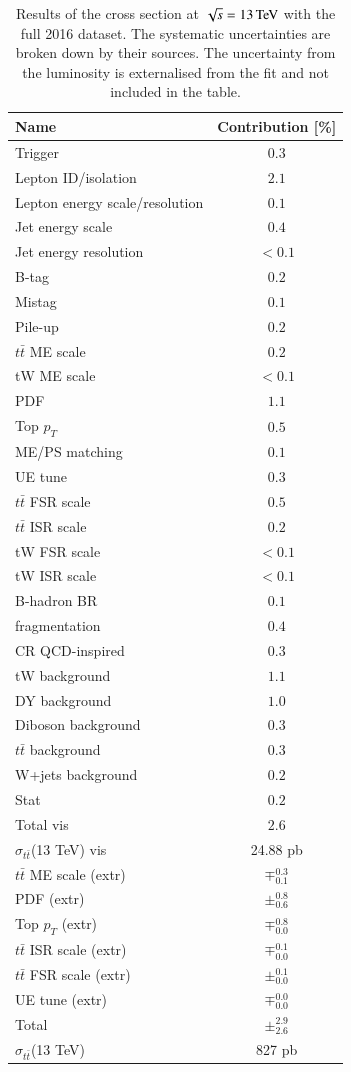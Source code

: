 \begin{table}[htbp!]
\center
\caption{Results of the \ttbar cross section at $\sqrt{s}= 13 \,\text{Te\hspace{-.08em}V}$ with the full 2016 dataset. The systematic uncertainties are broken down by their sources. The uncertainty from the luminosity is externalised from the fit
and not included in the table. 
\label{tab:lh_res_eightsimple}}
\begin{tabular}{ l |  c }
 \hline
Name & Contribution [\%] \\ \hline
Trigger & ${0.3}$ \\
Lepton ID/isolation & ${2.1}$ \\
Lepton energy scale/resolution & ${0.1}$ \\
Jet energy scale & ${0.4}$ \\
Jet energy resolution & ${ < 0.1}$ \\
B-tag & ${0.2}$ \\
Mistag & ${0.1}$ \\
Pile-up & ${0.2}$ \\
$t\bar{t}$ ME scale & ${0.2}$ \\
tW ME scale & ${< 0.1}$ \\
PDF & ${1.1}$ \\
Top $p_{T}$ & ${0.5}$ \\
ME/PS matching & ${0.1}$ \\
UE tune & ${0.3}$ \\
$t\bar{t}$ FSR scale & ${0.5}$ \\
$t\bar{t}$ ISR scale & ${0.2}$ \\
tW FSR scale & ${< 0.1}$ \\
tW ISR scale & ${< 0.1}$ \\
B-hadron BR & ${0.1}$ \\
fragmentation & ${0.4}$ \\
CR QCD-inspired & ${0.3}$ \\
tW background & ${1.1}$ \\
DY background & ${1.0}$ \\
Diboson background & ${0.3}$ \\
$t\bar{t}$ background & ${0.3}$ \\
W+jets background & ${0.2}$ \\
Stat & ${0.2}$ \\
Total vis & ${2.6}$ \\ \hline
$\sigma_{t\bar{t}}$(13 TeV) vis & 24.88 pb \\ \hline
$t\bar{t}$ ME scale (extr) & $\mp^{0.3}_{0.1}$ \\
PDF (extr) & $\pm^{0.8}_{0.6}$ \\
Top $p_{T}$ (extr) & $\mp^{0.8}_{0.0}$ \\
$t\bar{t}$ ISR scale (extr) & $\mp^{0.1}_{0.0}$ \\
$t\bar{t}$ FSR scale (extr) & $\pm^{0.1}_{0.0}$ \\
UE tune (extr) & $\mp^{0.0}_{0.0}$ \\
 \hline
Total & $\pm^{2.9}_{2.6}$ \\ \hline
$\sigma_{t\bar{t}}$(13 TeV) & 827 pb \\ \hline \hline
\end{tabular}
\end{table}

